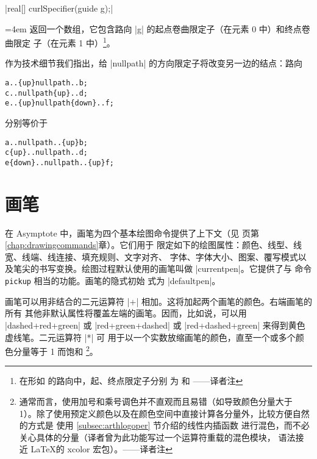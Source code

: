 \documentclass[nofonts,CJKnormalspaces]{ctexbook}[2009/05/20]
\makeatletter
\newenvironment{funclist}{\trivlist
  \parindent=0pt
\item[]
  \def\item{\medskip\par\leftskip=0pt}
  \def\go{\par\leftskip=4em}}
{\endtrivlist}
\newenvironment{typelist}{\itemize
  \let\old@item\@item
  \def\@item[##1]{\expandafter\old@item[\ttfamily\color{type!50!black}##1]}}
{\enditemize}
\newcommand*\prgname[1]{\textsf{#1}}
\newcommand\transnote[1]{\footnote{#1——译者注}}
\makeatother
\begin{document}
\begin{typelist}
\begin{funclist}
\item |real[] curlSpecifier(guide g);| \go
  返回一个数组，它包含路向 |g| 的起点卷曲限定子（在元素 0 中）和终点卷曲限定
  子（在元素 1 中）\transnote{在形如
   的路向中，起、终点限定子分别
  为 \inlinecode{c1} 和 \inlinecode{c2}}。
\end{funclist}

作为技术细节我们指出，给 |nullpath| 的方向限定子将改变另一边的结点：路向
\begin{lstlisting}
a..{up}nullpath..b;
c..nullpath{up}..d;
e..{up}nullpath{down}..f;
\end{lstlisting}
分别等价于
\begin{lstlisting}
a..nullpath..{up}b;
c{up}..nullpath..d;
e{down}..nullpath..{up}f;
\end{lstlisting}
\end{typelist}

\section{画笔}
\label{sec:pens}

在 \prgname{Asymptote} 中，画笔为四个基本绘图命令提供了上下文（见
\pageref{chap:drawingcommands} 页第\ref{chap:drawingcommands}章）。它们用于
限定如下的绘图属性：颜色、线型、线宽、线端、线连接、填充规则、文字对齐、
字体、字体大小、图案、覆写模式以及笔尖的书写变换。绘图过程默认使用的画笔叫做
|currentpen|。它提供了与 \MP{} 命令 \verb=pickup= 相当的功能。画笔的隐式初始
式为 |defaultpen|。

画笔可以用非结合的二元运算符 |+| 相加。这将加起两个画笔的颜色。右端画笔的所有
其他非默认属性将覆盖左端的画笔。因而，比如说，可以用 |dashed+red+green| 或
|red+green+dashed| 或 |red+dashed+green| 来得到黄色虚线笔。二元运算符 |*| 可
用于以一个实数放缩画笔的颜色，直至一个或多个颜色分量等于 1 而饱和%
\transnote{通常而言，使用加号和乘号调色并不直观而且易错（如导致颜色分量大于
1）。除了使用预定义颜色以及在颜色空间中直接计算各分量外，比较方便自然的方式是
使用 \ref{subsec:arthlogoper} 节介绍的线性内插函数
\inlinecode{interp(T a, T b, real t)}
进行混色，而不必关心具体的分量（译者曾为此功能写过一个运算符重载的混色模块，
语法接近 \LaTeX 的 \prgname{xcolor} 宏包）。}。
\end{document}
